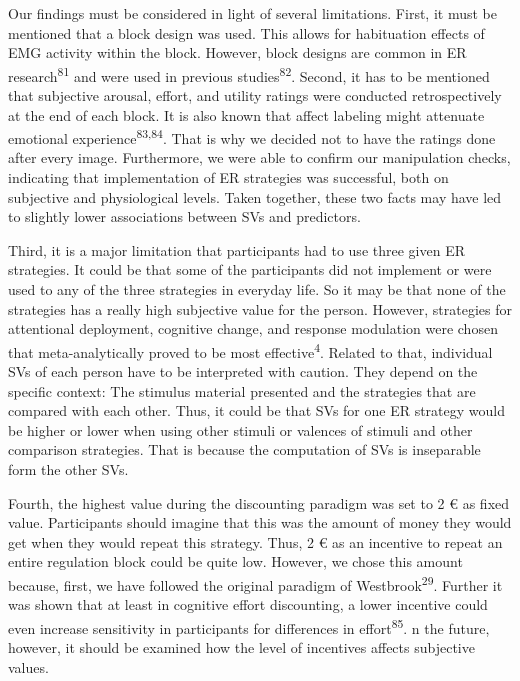 \documentclass[
  man,floatsintext]{apa6}
\begin{document}
Our findings must be considered in light of several limitations.
First, it must be mentioned that a block design was used.
This allows for habituation effects of EMG activity within the block.
However, block designs are common in ER research\textsuperscript{81} and were used in previous studies\textsuperscript{82}.
Second, it has to be mentioned that subjective arousal, effort, and utility ratings were conducted retrospectively at the end of each block.
It is also known that affect labeling might attenuate emotional experience\textsuperscript{83,84}.
That is why we decided not to have the ratings done after every image.
Furthermore, we were able to confirm our manipulation checks, indicating that implementation of ER strategies was successful, both on subjective and physiological levels.
Taken together, these two facts may have led to slightly lower associations between SVs and predictors.

Third, it is a major limitation that participants had to use three given ER strategies.
It could be that some of the participants did not implement or were used to any of the three strategies in everyday life.
So it may be that none of the strategies has a really high subjective value for the person.
However, strategies for attentional deployment, cognitive change, and response modulation were chosen that meta-analytically proved to be most effective\textsuperscript{4}.
Related to that, individual SVs of each person have to be interpreted with caution.
They depend on the specific context: The stimulus material presented and the strategies that are compared with each other.
Thus, it could be that SVs for one ER strategy would be higher or lower when using other stimuli or valences of stimuli and other comparison strategies.
That is because the computation of SVs is inseparable form the other SVs.

Fourth, the highest value during the discounting paradigm was set to 2 € as fixed value.
Participants should imagine that this was the amount of money they would get when they would repeat this strategy.
Thus, 2 € as an incentive to repeat an entire regulation block could be quite low.
However, we chose this amount because, first, we have followed the original paradigm of Westbrook\textsuperscript{29}.
Further it was shown that at least in cognitive effort discounting, a lower incentive could even increase sensitivity in participants for differences in effort\textsuperscript{85}.
n the future, however, it should be examined how the level of incentives affects subjective values.
\end{document}
